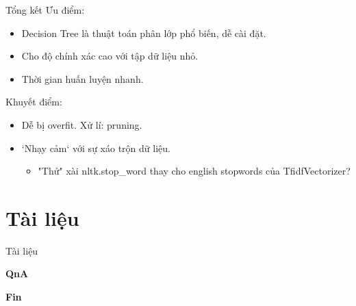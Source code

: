\documentclass[aspectratio=169,xcolor=dvipsnames]{beamer}
\begin{document}
\begin{frame}{Tổng kết}
Ưu điểm:
\begin{itemize}
\item Decision Tree là thuật toán phân lớp phổ biến, dễ cài đặt.
\item Cho độ chính xác cao với tập dữ liệu nhỏ.
\item Thời gian huấn luyện nhanh.
\end{itemize}
Khuyết điểm:
\begin{itemize}
\item Dễ bị overfit. Xử lí: pruning.
\item `Nhạy cảm` với sự xáo trộn dữ liệu.\cite{Kowsari_2019}
\begin{itemize}
	\item "Thử" xài nltk.stop\_word thay cho english stopwords của TfidfVectorizer?
\end{itemize}
\end{itemize}
\end{frame}

\section{Tài liệu}

\begin{frame}{Tài liệu}
	\printbibliography
\end{frame}

\begin{frame}
    \Huge{\centerline{\textbf{QnA}}}
\end{frame}

\begin{frame}
    \Huge{\centerline{\textbf{Fin}}}
\end{frame}
\end{document}
